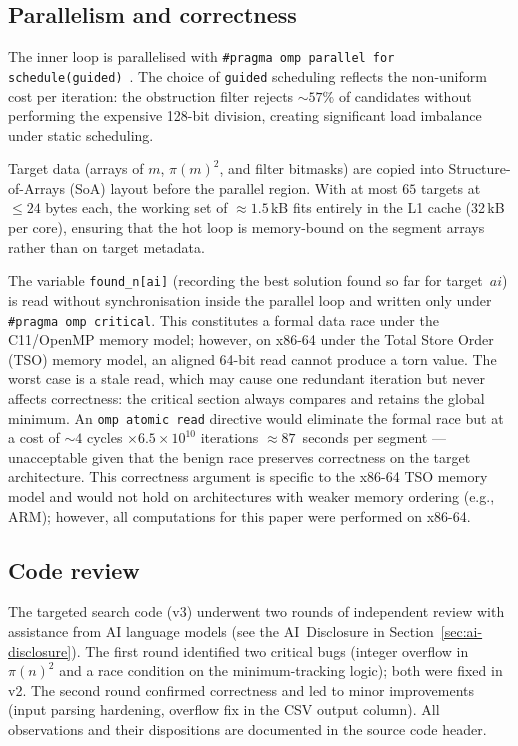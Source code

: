 \documentclass[11pt]{article}
\theoremstyle{definition}
\theoremstyle{remark}
\numberwithin{equation}{section}
\begin{document}
\subsection{Parallelism and correctness}

The inner loop is parallelised with
\texttt{\#pragma omp parallel for schedule(guided)}~\cite{OpenMP}.
The choice of \texttt{guided} scheduling reflects the non-uniform
cost per iteration: the obstruction filter rejects $\sim 57\%$ of
candidates without performing the expensive 128-bit division,
creating significant load imbalance under static scheduling.

Target data (arrays of $m$, $\pi(m)^2$, and filter bitmasks)
are copied into Structure-of-Arrays (SoA) layout before the
parallel region.  With at most $65$ targets at $\le 24$ bytes each,
the working set of $\approx 1.5$\,kB fits entirely in the L1 cache
(32\,kB per core), ensuring that the hot loop is memory-bound on
the segment arrays rather than on target metadata.

The variable \texttt{found\_n[ai]} (recording the best solution
found so far for target~$ai$) is read without synchronisation
inside the parallel loop and written only under
\texttt{\#pragma omp critical}.  This constitutes a formal data
race under the C11/OpenMP memory model; however, on x86-64 under
the Total Store Order (TSO) memory model, an aligned 64-bit read
cannot produce a torn value.  The worst case is a stale read, which
may cause one redundant iteration but never affects correctness:
the critical section always compares and retains the global minimum.
An \texttt{omp atomic read} directive would eliminate the formal
race but at a cost of $\sim 4$ cycles $\times 6.5 \times 10^{10}$
iterations $\approx 87$~seconds per segment --- unacceptable given
that the benign race preserves correctness on the target
architecture.
This correctness argument is specific to the x86-64 TSO memory
model and would not hold on architectures with weaker memory
ordering (e.g., ARM); however, all computations for this paper
were performed on x86-64.

\subsection{Code review}

The targeted search code (v3) underwent two rounds of independent
review with assistance from AI language models (see the AI~Disclosure
in Section~\ref{sec:ai-disclosure}).
The first round identified two critical bugs
(integer overflow in $\pi(n)^2$ and a race condition on the
minimum-tracking logic); both were fixed in v2.
The second round confirmed correctness and led to
minor improvements (input parsing hardening, overflow fix in the
CSV output column).
All observations and their dispositions are documented in the source
code header.
\end{document}

